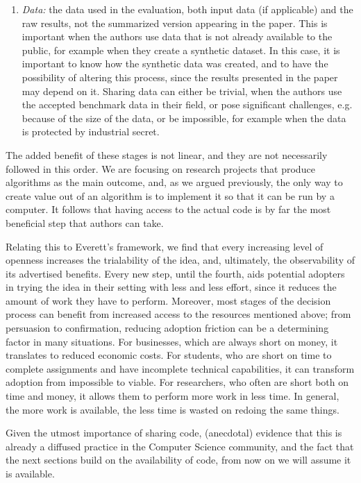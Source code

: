 \documentclass[12pt]{article}
\begin{document}
\begin{enumerate}
\item \emph{Data:} the data used in the evaluation, both input data (if applicable) and the raw results, not the summarized version appearing in the paper. This is important when the authors use data that is not already available to the public, for example when they create a synthetic dataset. In this case, it is important to know how the synthetic data was created, and to have the possibility of altering this process, since the results presented in the paper may depend on it. Sharing data can either be trivial, when the authors use the accepted benchmark data in their field, or pose significant challenges, e.g. because of the size of the data, or be impossible, for example when the data is protected by industrial secret.
\end{enumerate}

The added benefit of these stages is not linear, and they are not necessarily followed in this order. We are focusing on research projects that produce algorithms as the main outcome, and, as we argued previously, the only way to create value out of an algorithm is to implement it so that it can be run by a computer. It follows that having access to the actual code is by far the most beneficial step that authors can take.

Relating this to Everett's framework, we find that every increasing level of openness increases the trialability of the idea, and, ultimately, the observability of its advertised benefits. Every new step, until the fourth, aids potential adopters in trying the idea in their setting with less and less effort, since it reduces the amount of work they have to perform. Moreover, most stages of the decision process can benefit from increased access to the resources mentioned above; from persuasion to confirmation, reducing adoption friction can be a determining factor in many situations. For businesses, which are always short on money, it translates to reduced economic costs. For students, who are short on time to complete assignments and have incomplete technical capabilities, it can transform adoption from impossible to viable. For researchers, who often are short both on time and money, it allows them to perform more work in less time. In general, the more work is available, the less time is wasted on redoing the same things.

Given the utmost importance of sharing code, (anecdotal) evidence that this is already a diffused practice in the Computer Science community, and the fact that the next sections build on the availability of code, from now on we will assume it is available.
\end{document}
